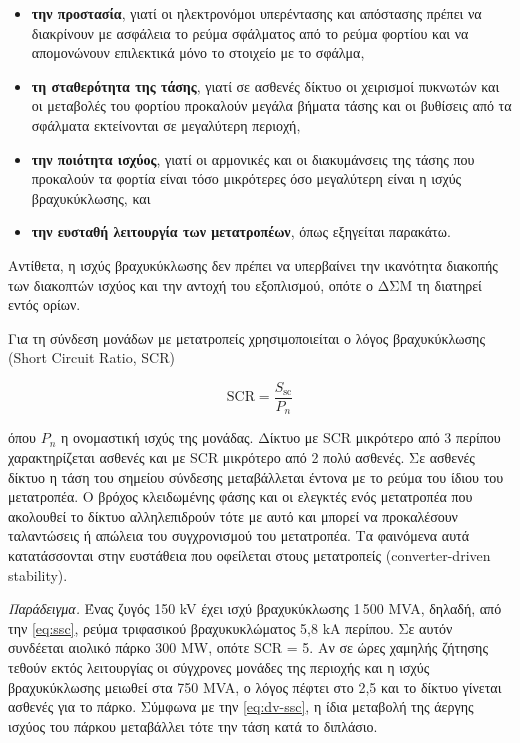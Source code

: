 \begin{itemize}
\item \textbf{την προστασία}, γιατί οι ηλεκτρονόμοι υπερέντασης και απόστασης πρέπει να
      διακρίνουν με ασφάλεια το ρεύμα σφάλματος από το ρεύμα φορτίου και να απομονώνουν
      επιλεκτικά μόνο το στοιχείο με το σφάλμα,
\item \textbf{τη σταθερότητα της τάσης}, γιατί σε ασθενές δίκτυο οι χειρισμοί πυκνωτών και οι
      μεταβολές του φορτίου προκαλούν μεγάλα βήματα τάσης και οι βυθίσεις από τα σφάλματα
      εκτείνονται σε μεγαλύτερη περιοχή,
\item \textbf{την ποιότητα ισχύος}, γιατί οι αρμονικές και οι διακυμάνσεις της τάσης που
      προκαλούν τα φορτία είναι τόσο μικρότερες όσο μεγαλύτερη είναι η ισχύς βραχυκύκλωσης, και
\item \textbf{την ευσταθή λειτουργία των μετατροπέων}, όπως εξηγείται παρακάτω.
\end{itemize}

Αντίθετα, η ισχύς βραχυκύκλωσης δεν πρέπει να υπερβαίνει την ικανότητα διακοπής των διακοπτών
ισχύος και την αντοχή του εξοπλισμού, οπότε ο ΔΣΜ τη διατηρεί εντός ορίων.

Για τη σύνδεση μονάδων με μετατροπείς χρησιμοποιείται ο λόγος βραχυκύκλωσης (Short Circuit
Ratio, SCR)

\begin{equation}
\mathrm{SCR} = \frac{S_{\mathrm{sc}}}{P_n}
\label{eq:scr}
\end{equation}

όπου $P_n$ η ονομαστική ισχύς της μονάδας. Δίκτυο με SCR μικρότερο από 3 περίπου
χαρακτηρίζεται ασθενές και με SCR μικρότερο από 2 πολύ ασθενές. Σε ασθενές δίκτυο η τάση του
σημείου σύνδεσης μεταβάλλεται έντονα με το ρεύμα του ίδιου του μετατροπέα. Ο βρόχος κλειδωμένης
φάσης και οι ελεγκτές ενός μετατροπέα που ακολουθεί το δίκτυο αλληλεπιδρούν τότε με αυτό και
μπορεί να προκαλέσουν ταλαντώσεις ή απώλεια του συγχρονισμού του μετατροπέα. Τα φαινόμενα αυτά
κατατάσσονται στην ευστάθεια που οφείλεται στους μετατροπείς (converter-driven stability).

\emph{Παράδειγμα.} Ένας ζυγός 150 kV έχει ισχύ βραχυκύκλωσης 1\,500 MVA, δηλαδή, από την
\eqref{eq:ssc}, ρεύμα τριφασικού βραχυκυκλώματος 5,8 kA περίπου. Σε αυτόν συνδέεται αιολικό
πάρκο 300 MW, οπότε SCR = 5. Αν σε ώρες χαμηλής ζήτησης τεθούν εκτός λειτουργίας
οι σύγχρονες μονάδες της περιοχής και η ισχύς βραχυκύκλωσης μειωθεί στα 750 MVA, ο λόγος πέφτει στο 2,5 και το
δίκτυο γίνεται ασθενές για το πάρκο. Σύμφωνα με την \eqref{eq:dv-ssc}, η ίδια μεταβολή της
άεργης ισχύος του πάρκου μεταβάλλει τότε την τάση κατά το διπλάσιο.


